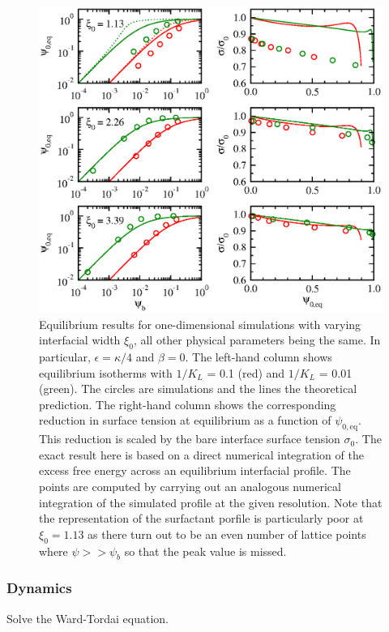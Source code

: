 \begin{figure}
\begin{center}
\includegraphics{surfactant_fig1.eps}
\end{center}
\caption{Equilibrium results for one-dimensional simulations with
varying interfacial width $\xi_0$, all other physical parameters
being the same. In particular, $\epsilon = \kappa/4$ and $\beta = 0$.
The
left-hand column shows equilibrium isotherms with $1/K_L$ = 0.1 (red)
and $1/K_L$ = 0.01 (green). The circles are simulations and the lines
the theoretical prediction. The right-hand column shows the
corresponding reduction in surface tension at equilibrium
as a function of $\psi_{0,\mathrm{eq}}$. This reduction is scaled by
the bare interface surface tension $\sigma_0$. The exact result here
is based on a direct numerical integration of the excess free energy
across an equilibrium interfacial profile. The points are computed
by carrying out an analogous numerical integration of the simulated
profile at the given resolution. Note that the representation of
the surfactant porfile is particularly poor at $\xi_0 = 1.13$ as
there turn out to be an even number of lattice points where
$\psi >> \psi_b$ so that the peak value is missed.}
\end{figure}



\subsubsection{Dynamics}

Solve the Ward-Tordai equation.



\vfill
\pagebreak
